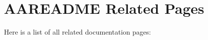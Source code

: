 \section{AAREADME Related Pages}
Here is a list of all related documentation pages:\begin{CompactList}
\item {}

\end{CompactList}
